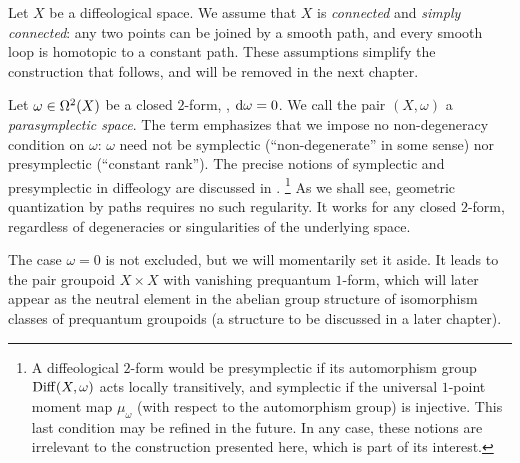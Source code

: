 \documentclass[10pt,reqno,letterpaper,twoside]{amsbook}
\begin{document}
  \begin{article}
    \label{art:classical-data}
    Let $X$ be a diffeological space.
    We assume that $X$ is \emph{connected} and \emph{simply connected}:
    any two points can be joined by a smooth path,
    and every smooth loop is homotopic to a constant path.
    These assumptions simplify the construction that follows,
    and will be removed in the next chapter.
    
    Let $\omega \in \Omega^2(X)$ be a closed $2$-form,
    \ie,
    $\mathrm{d}\omega = 0$.
    We call the pair $(X,\omega)$ a \emph{parasymplectic space}.
    The term emphasizes that we impose no non-degeneracy condition on $\omega$:
    $\omega$ need not be symplectic (``non-degenerate'' in some sense) nor presymplectic (``constant rank'').
    The precise notions of symplectic and presymplectic in diffeology are discussed in \cite{PIZ10}.%
    \footnote{A diffeological $2$-form would be presymplectic if its automorphism group $\operatorname{Diff}(X,\omega)$ acts locally transitively,
    and symplectic if the universal $1$-point moment map $\mu_\omega$ (with respect to the automorphism group) is injective.
    This last condition may be refined in the future.
    In any case,
    these notions are irrelevant to the construction presented here,
    which is part of its interest.}
    As we shall see,
    geometric quantization by paths requires no such regularity.
    It works for any closed $2$-form,
    regardless of degeneracies or singularities of the underlying space.
    
    The case $\omega = 0$ is not excluded,
    but we will momentarily set it aside.
    It leads to the pair groupoid $X \times X$ with vanishing prequantum $1$-form,
    which will later appear as the neutral element in the abelian group structure
    of isomorphism classes of prequantum groupoids
    (a structure to be discussed in a later chapter).
  \end{article}
  
\end{document}
